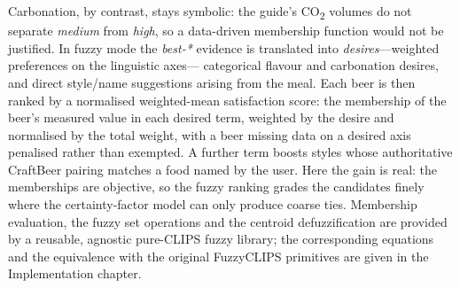 Carbonation, by contrast, stays symbolic: the guide's CO\textsubscript{2} volumes
do not separate \emph{medium} from \emph{high}, so a data-driven membership
function would not be justified. In fuzzy mode the \emph{best-*} evidence is
translated into \emph{desires}---weighted preferences on the linguistic axes---
categorical flavour and carbonation desires, and direct style/name suggestions
arising from the meal. Each beer is then ranked by a normalised weighted-mean
satisfaction score: the membership of the beer's measured value in each desired
term, weighted by the desire and normalised by the total weight, with a beer
missing data on a desired axis penalised rather than exempted. A further term
boosts styles whose authoritative CraftBeer pairing matches a food named by the
user. Here the gain is real: the memberships are objective, so the fuzzy ranking
grades the candidates finely where the certainty-factor model can only produce
coarse ties. Membership evaluation, the fuzzy set operations and the centroid
defuzzification are provided by a reusable, agnostic pure-CLIPS fuzzy library; the
corresponding equations and the equivalence with the original FuzzyCLIPS
primitives are given in the Implementation chapter.
